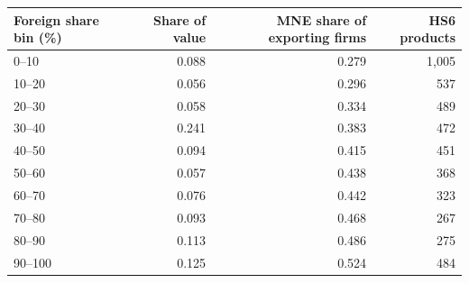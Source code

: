 \begin{tabular}{lrrr}
\toprule
Foreign share bin (\%) & Share of value & MNE share of exporting firms & HS6 products \\
\midrule
0--10 & 0.088 & 0.279 & 1,005 \\
10--20 & 0.056 & 0.296 & 537 \\
20--30 & 0.058 & 0.334 & 489 \\
30--40 & 0.241 & 0.383 & 472 \\
40--50 & 0.094 & 0.415 & 451 \\
50--60 & 0.057 & 0.438 & 368 \\
60--70 & 0.076 & 0.442 & 323 \\
70--80 & 0.093 & 0.468 & 267 \\
80--90 & 0.113 & 0.486 & 275 \\
90--100 & 0.125 & 0.524 & 484 \\
\bottomrule
\end{tabular}
